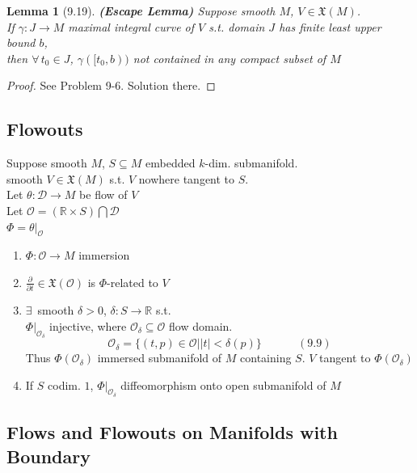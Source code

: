 \documentclass[11pt]{amsart}
\newtheorem{lemma}{Lemma}
\theoremstyle{definition}
\begin{document}
\begin{lemma}[9.19] \textbf{(Escape Lemma)}
Suppose smooth $M$, $V\in \mathfrak{X}(M)$.  \\
If $\gamma: J \to M$ maximal integral curve of $V$ s.t. domain $J$ has finite least upper bound $b$, \\
\phantom{ \quad \, } then $\forall \, t_0 \in J$, $\gamma([t_0,b))$ not contained in any compact subset of $M$
\end{lemma}

\begin{proof}
See Problem 9-6.  Solution there.
\end{proof}

\subsection*{Flowouts}

Suppose smooth $M$, $S\subseteq M$ embedded $k$-dim. submanifold. \\
smooth $V \in \mathfrak{X}(M)$ s.t. $V$ nowhere tangent to $S$.  \\
Let $\theta:\mathcal{D} \to M$ be flow of $V$  \\
Let $\mathcal{O} = (\mathbb{R}\times S) \bigcap \mathcal{D}$ \\
\phantom{Let } $\Phi= \left. \theta \right|_{\mathcal{O}}$
\begin{enumerate}
\item[(a)] $\Phi : \mathcal{O} \to M$ immersion
\item[(b)] $\frac{ \partial }{ \partial t} \in \mathfrak{X}(\mathcal{O})$ is $\Phi$-related to $V$
\item[(c)] $\exists \, $ smooth $\delta >0$, $\delta : S \to \mathbb{R}$ s.t. \\
$\left. \Phi \right|_{\mathcal{O}_{\delta}}$ injective, where $\mathcal{O}_{\delta} \subseteq \mathcal{O}$ flow domain.
\begin{equation}
  \mathcal{O}_{\delta} = \lbrace (t,p) \in \mathcal{O} | |t| < \delta(p) \rbrace \quad \quad \quad \, (9.9)
\end{equation}
Thus $\Phi(\mathcal{O}_{\delta})$ immersed submanifold of $M$ containing $S$. $V$ tangent to $\Phi(\mathcal{O}_{\delta})$
\item[(d)] If $S$ codim. $1$, $\left. \Phi \right|_{\mathcal{O}_{\delta}}$ diffeomorphism onto open submanifold of $M$
\end{enumerate}

\subsection*{Flows and Flowouts on Manifolds with Boundary }
\end{document}
